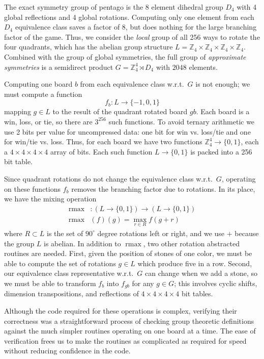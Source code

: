 \documentclass[conference]{IEEEtran}
\newcommand{\Z}{\mathbb{Z}}
\newcommand{\wrt}{w.\thinspace r.\thinspace t.\ }
\DeclareMathOperator{\rmax}{rmax}
\begin{document}
The exact symmetry group of pentago is the 8 element dihedral group $D_4$ with 4 global reflections and
4 global rotations.  Computing only one element from each $D_4$ equivalence class saves a factor of $8$,
but does nothing for the large branching factor of the game.  Thus, we consider the \emph{local} group of
all 256 ways to rotate the four quadrants, which has the abelian group structure
$L = \Z_4 \times \Z_4 \times \Z_4 \times \Z_4$.
Combined with the group of global symmetries, the full group of \emph{approximate symmetries} is a semidirect product
$G = \Z_4^4 \rtimes D_4$ with $2048$ elements.

Computing one board $b$ from each equivalence class \wrt $G$ is not enough; we must compute a function
$$f_b : L \to \{-1,0,1\}$$
mapping $g \in L$ to the result of the quadrant rotated board $gb$.  Each board is a win,
loss, or tie, so there are $3^{256}$ such functions.  To avoid ternary arithmetic we use 2 bits per value for
uncompressed data: one bit for win vs. loss/tie and one for win/tie vs. loss.  Thus, for each board we have two
functions $\Z_4^4 \to \{0,1\}$, each a $4 \times 4 \times 4 \times 4$ array of bits.  Each such function
$L \to \{0,1\}$ is packed into a 256 bit table.

Since quadrant rotations do not change the equivalence class \wrt $G$, operating on these functions $f_b$ removes
the branching factor due to rotations.  In its place, we have the mixing operation
\begin{align*}
\rmax &: \left(L \to \{0,1\}\right) \to \left(L \to \{0,1\}\right) \\
\rmax&(f)(g) = \max_{r \in R} f(g+r)
\end{align*}
where $R \subset L$ is the set of $90^\circ$ degree rotations left or right, and we use $+$ because the
group $L$ is abelian.  In addition to $\rmax$, two other rotation abstracted routines are needed.
First, given the position of stones of one color, we must be able to compute the set of rotations
$g \in L$ which produce five in a row.  Second, our equivalence class representative \wrt $G$ can change
when we add a stone, so we must be able to transform $f_b$ into $f_{gb}$ for any $g \in G$; this
involves cyclic shifts, dimension transpositions, and reflections of $4 \times 4 \times 4 \times 4$ bit tables.

Although the code required for these operations is complex, verifying their correctness was a
straightforward process of checking group theoretic definitions against the much simpler routines
operating on one board at a time.  The ease of verification frees us to make the routines as complicated as required
for speed without reducing confidence in the code.
\end{document}
